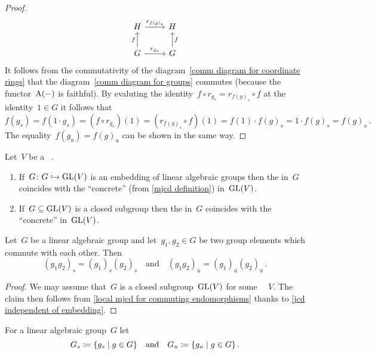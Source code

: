 \begin{proof}
\begin{equation}
\begin{tikzcd}
        H
        \arrow{r}[above]{r_{f(g)_s}}
      & H
      \\
        G
        \arrow{u}[left]{f}
        \arrow{r}[above]{r_{g_s}}
      & G
        \arrow{u}[right]{f}
    \end{tikzcd}
  \end{equation}
  It follows from the commutativity of the diagram~\eqref{comm diagram for coordinate rings} that the diagram~\eqref{comm diagram for groups} commutes (because the functor~$\operatorname{A}(-)$ is faithful).
  By evaluting the identity~$f \circ r_{g_s} = r_{f(g)_s} \circ f$ at the identity~$1 \in G$ it follows that
  \[
      f(g_s)
    = f(1 \cdot g_s)
    = ( f \circ r_{g_s} )(1)
    = ( r_{f(g)_s} \circ f )(1)
    = f(1) \cdot f(g)_s
    = 1 \cdot f(g)_s
    = f(g)_s \,.
  \]
  The equality~$f(g_u) = f(g)_u$ can be shown in the same way.
\end{proof}


\begin{corollary}
  \label{jcd independent of embedding}
  Let~$V$ be a {\fd}~{\kvs}.
  \begin{enumerate}
    \item
      If~$G \colon G \hookrightarrow \operatorname{GL}(V)$ is an embedding of linear algebraic groups then the {\JCD} in~$G$ coincides with the \enquote{concrete} {\JCD} (from \cref{mjcd definition}) in~$\operatorname{GL}(V)$.
    \item
      If~$G \subseteq \operatorname{GL}(V)$ is a closed subgroup then the {\JCD} in~$G$ coincides with the \enquote{concrete} {\JCD} in~$\operatorname{GL}(V)$.
    \qedhere
  \end{enumerate}
\end{corollary}


\begin{lemma}
  Let~$G$ be a linear algebraic group and let~$g_1, g_2 \in G$ be two group elements which commute with each other.
  Then
  \[
      (g_1 g_2)_s
    = (g_1)_s (g_2)_s
    \quad\text{and}\quad
      (g_1 g_2)_u
    = (g_1)_u (g_2)_u \,.
  \]
\end{lemma}


\begin{proof}
  We may assume that~$G$ is a closed subgroup~$\operatorname{GL}(V)$ for some {\fd}~{\kvs}~$V$.
  The claim then follows from \cref{local mjcd for commuting endomorphisms} thanks to \cref{jcd independent of embedding}.
\end{proof}


\begin{definition}
  For a linear algebraic group~$G$ let
  \[
              G_s
    \defined  \{ g_s \suchthat g \in G \}
    \quad\text{and}\quad
              G_u
    \defined  \{ g_u \suchthat g \in G \} \,.
  \]
\end{definition}


